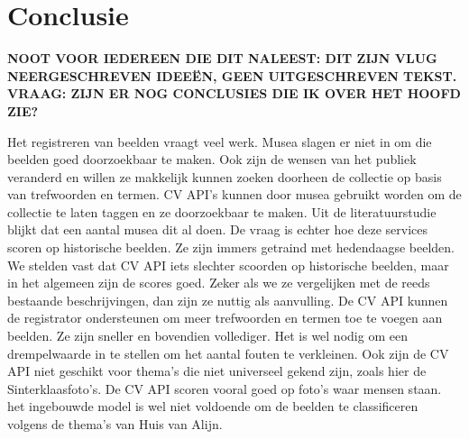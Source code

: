 
\chapter{Conclusie}
\label{ch:conclusie}


\textbf{NOOT VOOR IEDEREEN DIE DIT NALEEST: DIT ZIJN VLUG NEERGESCHREVEN IDEEËN, GEEN UITGESCHREVEN TEKST. VRAAG: ZIJN ER NOG CONCLUSIES DIE IK OVER HET HOOFD ZIE?}

Het registreren van beelden vraagt veel werk. Musea slagen er niet in om die beelden goed doorzoekbaar te maken.
Ook zijn de wensen van het publiek veranderd en willen ze makkelijk kunnen zoeken doorheen de collectie op basis van trefwoorden en termen.
CV API's kunnen door musea gebruikt worden om de collectie te laten taggen en ze doorzoekbaar te maken. Uit de literatuurstudie blijkt dat een aantal musea dit al doen.
De vraag is echter hoe deze services scoren op historische beelden. Ze zijn immers getraind met hedendaagse beelden.
We stelden vast dat CV API iets slechter scoorden op historische beelden, maar in het algemeen zijn de scores goed. Zeker als we ze vergelijken met de reeds bestaande beschrijvingen, dan zijn ze nuttig als aanvulling. De CV API kunnen de registrator ondersteunen om meer trefwoorden en termen toe te voegen aan beelden. Ze zijn sneller en bovendien vollediger. 
Het is wel nodig om een drempelwaarde in te stellen om het aantal fouten te verkleinen. Ook zijn de CV API niet geschikt voor thema's die niet universeel gekend zijn, zoals hier de Sinterklaasfoto's. De CV API scoren vooral goed op foto's waar mensen staan.
het ingebouwde model is wel niet voldoende om de beelden te classificeren volgens de thema's van Huis van Alijn.


